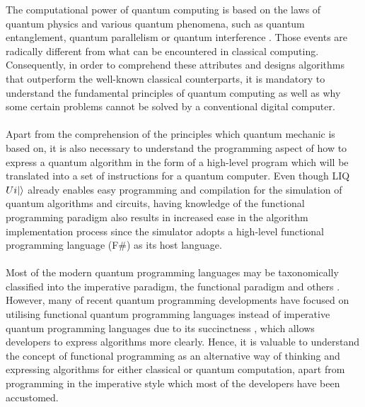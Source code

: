 \documentclass[12pt]{third-rep}
\begin{document}
\noindent The computational power of quantum computing is based on the laws of quantum physics and various quantum phenomena, such as quantum entanglement,  quantum parallelism or quantum interference \cite{acm}. Those events are radically different from what can be encountered in classical computing. Consequently, in order to comprehend these attributes and designs algorithms that outperform the well-known classical counterparts, it is mandatory to understand the fundamental principles of quantum computing as well as why some certain problems cannot be solved by a conventional digital computer. \\\\
Apart from the comprehension of the principles which quantum mechanic is based on, it is also necessary to understand the programming aspect of how to express a quantum algorithm in the form of a high-level program which will be translated into a set of instructions for a quantum computer. Even though LIQ$Ui{\left\vert{}\right\rangle}$ already enables easy programming and compilation for the simulation of quantum algorithms and circuits, having knowledge of the functional programming paradigm also results in increased ease in the algorithm implementation process since the simulator adopts a high-level functional programming language (F\#) as its host language. \\\\
Most of the modern quantum programming languages may be taxonomically classified into the imperative paradigm, the functional paradigm and others \cite{qc-languages}. However, many of recent quantum programming developments have focused on utilising functional quantum programming languages instead of imperative quantum programming languages due to its succinctness \cite{functional}, which allows developers to express algorithms more clearly. Hence, it is valuable to understand the concept of functional programming as an alternative way of thinking and expressing algorithms for either classical or quantum computation, apart from programming in the imperative style which most of the developers have been accustomed.

\nocite{liquid-manual,circuit-tut}

\appendix

\titleformat{\chapter}{\normalfont\huge\bf}{\chaptertitlename \ \thechapter\ \ \ --}{20pt}{\huge\bf} 
\end{document}

